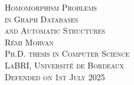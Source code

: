 \begin{titlepage}
\begin{center}
  \Huge\scshape%
  Homomorphism Problems
  \LARGE\\
  in Graph Databases\\
  and Automatic Structures\\
  \vfill
  \normalfont\LARGE{} \textsc{Rémi Morvan}\\[1em]
  \Large\scshape
  Ph.D. thesis in Computer Science\\
  \textcolor{maincolor}{LaBRI, Université de Bordeaux}\\
  \normalfont\Large\scshape Defended on 1st July 2025
\end{center}
\end{titlepage}
\restoregeometry